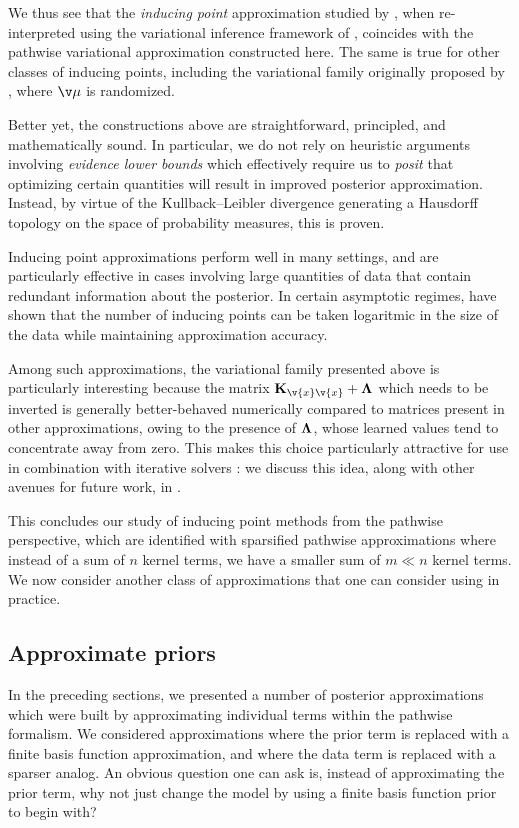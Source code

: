 \documentclass[11pt]{book}
\begin{document}
We thus see that the \emph{inducing point} approximation studied by \textcite{opper09}, when re-interpreted using the variational inference framework of \textcite{titsias09}, coincides with the pathwise variational approximation constructed here.
The same is true for other classes of inducing points, including the variational family originally proposed by \textcite{titsias09}, where $\v\mu$ is randomized.

Better yet, the constructions above are straightforward, principled, and mathematically sound.
In particular, we do not rely on heuristic arguments involving \emph{evidence lower bounds} which effectively require us to \emph{posit} that optimizing certain quantities will result in improved posterior approximation.
Instead, by virtue of the Kullback--Leibler divergence generating a Hausdorff topology on the space of probability measures, this is proven.

Inducing point approximations perform well in many settings, and are particularly effective in cases involving large quantities of data that contain redundant information about the posterior.
In certain asymptotic regimes, \textcite{burt19} have shown that the number of inducing points can be taken logaritmic in the size of the data while maintaining approximation accuracy.

Among such approximations, the variational family presented above is particularly interesting because the matrix $\m{K}_{\v{x}\v{x}} + \m\Lambda$ which needs to be inverted is generally better-behaved numerically compared to matrices present in other approximations, owing to the presence of $\m\Lambda$, whose learned values tend to concentrate away from zero.
This makes this choice particularly attractive for use in combination with iterative solvers \cite{dong17,gardner18,pleiss18,meanti20,pleiss20}: we discuss this idea, along with other avenues for future work, in .

This concludes our study of inducing point methods from the pathwise perspective, which are identified with sparsified pathwise approximations where instead of a sum of $n$ kernel terms, we have a smaller sum of $m \ll n$ kernel terms.
We now consider another class of approximations that one can consider using in practice.

\subsection{Approximate priors}
In the preceding sections, we presented a number of posterior approximations which were built by approximating individual terms within the pathwise formalism.
We considered approximations where the prior term is replaced with a finite basis function approximation, and where the data term is replaced with a sparser analog.
An obvious question one can ask is, instead of approximating the prior term, why not just change the model by using a finite basis function prior to begin with?
\end{document}
